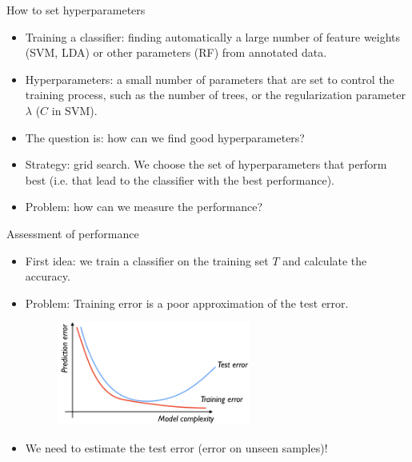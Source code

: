 \documentclass[xcolor=pdftex,dvipsnames,table]{beamer}
\begin{document}
\begin{frame}{How to set hyperparameters}
	\begin{itemize}
		\item Training a classifier: finding automatically a large number of feature weights (SVM, LDA) or other parameters (RF) from annotated data.
		\item Hyperparameters: a small number of parameters that are set to control the training process, such as the number of trees, or the regularization parameter $\lambda$ ($C$ in SVM).
		\item The question is: how can we find good hyperparameters?
		\item Strategy: grid search. We choose the set of hyperparameters that perform best (i.e. that lead to the classifier with the best performance).
		\item Problem: how can we measure the performance?
	\end{itemize}
\end{frame}

\begin{frame}{Assessment of performance}
	\begin{itemize}
		\item<1-> First idea: we train a classifier on the training set $T$ and calculate the accuracy.
		\item<2-> Problem: Training error is a poor approximation of the test error.
		\begin{figure}[htb]
			\includegraphics[width=0.6\textwidth]{../graphics/Training_and_test_error.png}
		\end{figure}
		\item<3-> We need to estimate the test error (error on unseen samples)!
	\end{itemize}
\end{frame}
\end{document}
